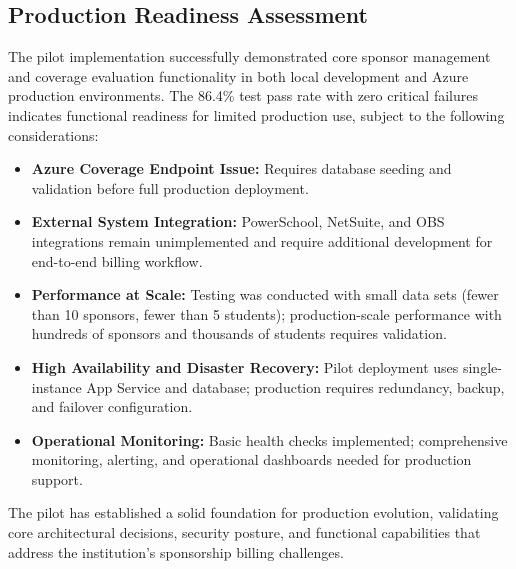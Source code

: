 \subsection{Production Readiness Assessment}

The pilot implementation successfully demonstrated core sponsor management and coverage evaluation functionality in both local development and Azure production environments. The 86.4\% test pass rate with zero critical failures indicates functional readiness for limited production use, subject to the following considerations:

\begin{itemize}
    \item \textbf{Azure Coverage Endpoint Issue:} Requires database seeding and validation before full production deployment.
    \item \textbf{External System Integration:} PowerSchool, NetSuite, and OBS integrations remain unimplemented and require additional development for end-to-end billing workflow.
    \item \textbf{Performance at Scale:} Testing was conducted with small data sets (fewer than 10 sponsors, fewer than 5 students); production-scale performance with hundreds of sponsors and thousands of students requires validation.
    \item \textbf{High Availability and Disaster Recovery:} Pilot deployment uses single-instance App Service and database; production requires redundancy, backup, and failover configuration.
    \item \textbf{Operational Monitoring:} Basic health checks implemented; comprehensive monitoring, alerting, and operational dashboards needed for production support.
\end{itemize}

The pilot has established a solid foundation for production evolution, validating core architectural decisions, security posture, and functional capabilities that address the institution's sponsorship billing challenges.